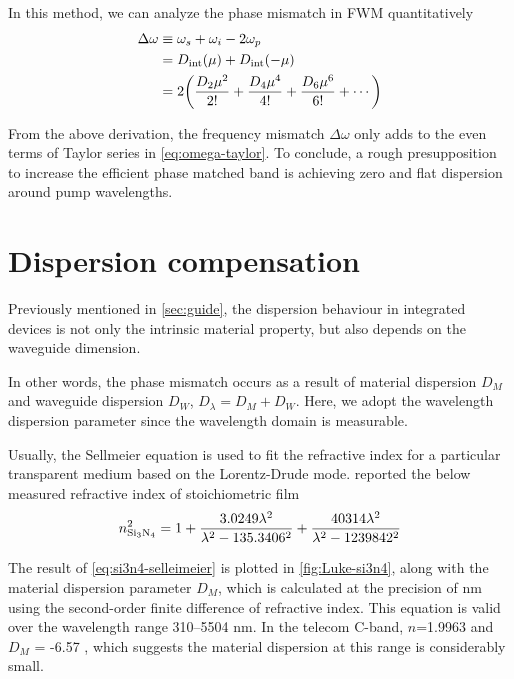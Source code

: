 In this method, we can analyze the phase mismatch in FWM quantitatively
\begin{align}\label{eq:freq-mismatch}
	\Delta \omega &\equiv \omega_s + \omega_i - 2 \omega_p \\
	&= D_\mathrm{int}(\mu) + D_\mathrm{int}(-\mu) \nonumber \\
	&= 2\qty(\frac{D_2 \mu^2}{2!} + \frac{D_4 \mu^4}{4!} + \frac{D_6 \mu^6}{6!} +\cdots)  \nonumber
\end{align}

From the above derivation, the frequency mismatch $ \Delta\omega $ only adds to the even terms of Taylor series in \autoref{eq:omega-taylor}.
To conclude, a rough presupposition to increase the efficient phase matched band is achieving zero and flat dispersion around pump wavelengths.

\section{Dispersion compensation}
Previously mentioned  in \autoref{sec:guide}, the dispersion behaviour in integrated devices is not only the intrinsic material property, but also depends on the waveguide dimension. 

In other words, the phase mismatch occurs as a result of material dispersion $D_M$ and waveguide dispersion $ D_W $, $D_{\lambda}= D_M + D_W$. Here, we adopt the wavelength dispersion parameter since the wavelength domain is measurable.

Usually, the Sellmeier equation is used to fit the refractive index for a particular transparent medium based on the Lorentz-Drude mode. \citeauthor{Luke2015a} reported the below measured refractive index of stoichiometric  film \cite{Luke2015a}
\begin{equation}\label{eq:si3n4-selleimeier}
    n_{\ce{Si3N4}}^2 = 1 + \frac{3.0249 \lambda^2}{\lambda^2-135.3406^2} + \frac{40314 \lambda^2}{\lambda^2 - 1239842^2}
\end{equation}

The result of \autoref{eq:si3n4-selleimeier} is plotted in \autoref{fig:Luke-si3n4}, along with the material dispersion parameter $D_M$, which is calculated at the precision of \si{\nm} using the second-order finite difference of refractive index. This equation is valid over the wavelength range 310–5504 \si{\nm}. In the telecom C-band, $n$=1.9963 and $D_M$ = -6.57 \dispu, which suggests the material dispersion at this range is considerably small.

